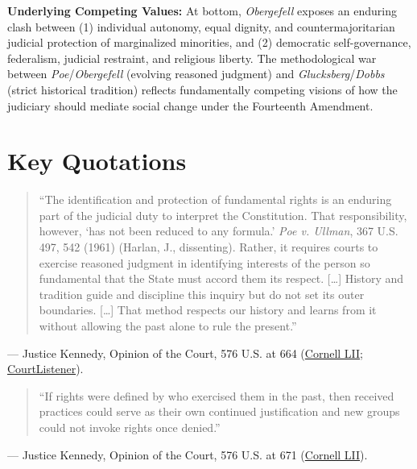 \documentclass[12pt]{article}
\begin{document}
\textbf{Underlying Competing Values:} At bottom, \textit{Obergefell} exposes an enduring clash between (1) individual autonomy, equal dignity, and countermajoritarian judicial protection of marginalized minorities, and (2) democratic self-governance, federalism, judicial restraint, and religious liberty. The methodological war between \textit{Poe}/\textit{Obergefell} (evolving reasoned judgment) and \textit{Glucksberg}/\textit{Dobbs} (strict historical tradition) reflects fundamentally competing visions of how the judiciary should mediate social change under the Fourteenth Amendment.

\section{Key Quotations}

\begin{quote}
``The identification and protection of fundamental rights is an enduring part of the judicial duty to interpret the Constitution. That responsibility, however, `has not been reduced to any formula.' \textit{Poe v. Ullman}, 367 U.S. 497, 542 (1961) (Harlan, J., dissenting). Rather, it requires courts to exercise reasoned judgment in identifying interests of the person so fundamental that the State must accord them its respect. [\dots] History and tradition guide and discipline this inquiry but do not set its outer boundaries. [\dots] That method respects our history and learns from it without allowing the past alone to rule the present.''
\end{quote}
\noindent --- Justice Kennedy, Opinion of the Court, 576 U.S. at 664 (\href{https://www.law.cornell.edu/supremecourt/text/14-556}{Cornell LII}; \href{https://www.courtlistener.com/opinion/2812209/obergefell-v-hodges/}{CourtListener}).

\begin{quote}
``If rights were defined by who exercised them in the past, then received practices could serve as their own continued justification and new groups could not invoke rights once denied.''
\end{quote}
\noindent --- Justice Kennedy, Opinion of the Court, 576 U.S. at 671 (\href{https://www.law.cornell.edu/supremecourt/text/14-556}{Cornell LII}).
\end{document}
